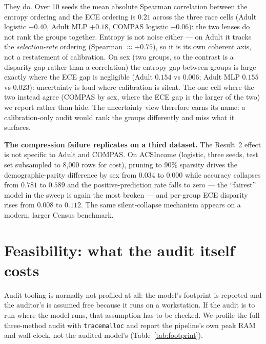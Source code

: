\documentclass{article}
\begin{document}
They do. Over 10 seeds the mean absolute Spearman correlation between the entropy ordering and the ECE ordering is $0.21$ across the three race cells (Adult logistic $-0.40$, Adult MLP $+0.18$, COMPAS logistic $-0.06$): the two lenses do not rank the groups together. Entropy is not noise either --- on Adult it tracks the \emph{selection-rate} ordering (Spearman $\approx +0.75$), so it is its own coherent axis, not a restatement of calibration. On sex (two groups, so the contrast is a disparity gap rather than a correlation) the entropy gap between groups is large exactly where the ECE gap is negligible (Adult $0.154$ vs $0.006$; Adult MLP $0.155$ vs $0.023$): uncertainty is loud where calibration is silent. The one cell where the two instead agree (COMPAS by sex, where the ECE gap is the larger of the two) we report rather than hide. The uncertainty view therefore earns its name: a calibration-only audit would rank the groups differently and miss what it surfaces.

\textbf{The compression failure replicates on a third dataset.} The Result~2 effect is not specific to Adult and COMPAS. On ACSIncome (logistic, three seeds, test set subsampled to 8{,}000 rows for cost), pruning to 90\% sparsity drives the demographic-parity difference by sex from $0.034$ to $0.000$ while accuracy collapses from $0.781$ to $0.589$ and the positive-prediction rate falls to zero --- the ``fairest'' model in the sweep is again the most broken --- and per-group ECE disparity rises from $0.008$ to $0.112$. The same silent-collapse mechanism appears on a modern, larger Census benchmark.

\section{Feasibility: what the audit itself costs}
\label{sec:feasibility}

Audit tooling is normally not profiled at all: the model's footprint is reported and the auditor's is assumed free because it runs on a workstation. If the audit is to run where the model runs, that assumption has to be checked. We profile the full three-method audit with \texttt{tracemalloc} and report the pipeline's own peak RAM and wall-clock, not the audited model's (Table~\ref{tab:footprint}).
\end{document}

